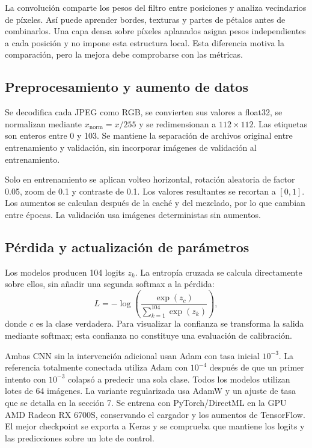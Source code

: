 La convolución comparte los pesos del filtro entre posiciones y analiza
vecindarios de píxeles. Así puede aprender bordes, texturas y partes de pétalos
antes de combinarlos. Una capa densa sobre píxeles aplanados asigna pesos
independientes a cada posición y no impone esta estructura local. Esta diferencia
motiva la comparación, pero la mejora debe comprobarse con las métricas.

\subsection{Preprocesamiento y aumento de datos}

Se decodifica cada JPEG como RGB, se convierten sus valores a float32, se
normalizan mediante $x_{\mathrm{norm}}=x/255$ y se redimensionan a $112\times112$.
Las etiquetas son enteros entre 0 y 103. Se mantiene la separación de archivos
original entre entrenamiento y validación, sin incorporar imágenes de validación
al entrenamiento.

Solo en entrenamiento se aplican volteo horizontal, rotación aleatoria de factor
0.05, zoom de 0.1 y contraste de 0.1. Los valores resultantes se recortan a $[0,1]$.
Los aumentos se calculan después de la caché y del mezclado, por lo que cambian
entre épocas. La validación usa imágenes deterministas sin aumentos.

\subsection{Pérdida y actualización de parámetros}

Los modelos producen 104 logits $z_k$. La entropía cruzada se calcula directamente
sobre ellos, sin añadir una segunda softmax a la pérdida:
\begin{equation}
L=-\log\left(\frac{\exp(z_c)}{\sum_{k=1}^{104}\exp(z_k)}\right),
\end{equation}
donde $c$ es la clase verdadera. Para visualizar la confianza se transforma la
salida mediante softmax; esta confianza no constituye una evaluación de calibración.

Ambas CNN sin la intervención adicional usan Adam con tasa inicial $10^{-3}$.
La referencia totalmente conectada utiliza Adam con $10^{-4}$ después de que
un primer intento con $10^{-3}$ colapsó a predecir una sola clase. Todos los
modelos utilizan lotes de 64 imágenes. La variante
regularizada usa AdamW y un ajuste de tasa que se detalla en la sección 7.
Se entrena con PyTorch/DirectML en la GPU AMD Radeon RX 6700S, conservando el
cargador y los aumentos de TensorFlow. El mejor checkpoint se exporta a Keras
y se comprueba que mantiene los logits y las predicciones sobre un lote de control.

